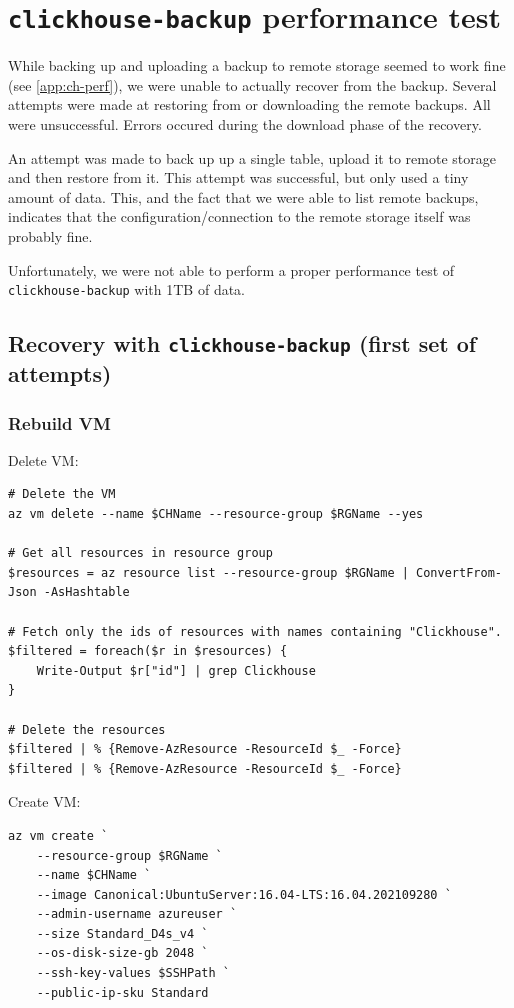 \section{\texttt{clickhouse-backup} performance test}
\label{app:chbk-perf}
While backing up and uploading a backup to remote storage
seemed to work fine (see \ref{app:ch-perf}),
we were unable to actually recover from the backup.
Several attempts were made at restoring from or downloading the remote backups.
All were unsuccessful.
Errors occured during the download phase of the recovery.

An attempt was made to back up up a single table,
upload it to remote storage and then restore from it.
This attempt was successful, but only used a tiny amount of data.
This, and the fact that we were able to list remote backups,
indicates that the configuration/connection to the remote storage itself was probably fine.

Unfortunately, we were not able to perform a proper
performance test of \texttt{clickhouse-backup} with 1TB of data.

\subsection{Recovery with \texttt{clickhouse-backup} (first set of attempts)}
\label{sec:org4d2ee6b}
\subsubsection{Rebuild VM}
\label{sec:org0452162}
Delete VM:
\begin{verbatim}
# Delete the VM
az vm delete --name $CHName --resource-group $RGName --yes

# Get all resources in resource group
$resources = az resource list --resource-group $RGName | ConvertFrom-Json -AsHashtable

# Fetch only the ids of resources with names containing "Clickhouse".
$filtered = foreach($r in $resources) {
    Write-Output $r["id"] | grep Clickhouse
}

# Delete the resources
$filtered | % {Remove-AzResource -ResourceId $_ -Force}
$filtered | % {Remove-AzResource -ResourceId $_ -Force}
\end{verbatim}

Create VM:
\begin{verbatim}
az vm create `
    --resource-group $RGName `
    --name $CHName `
    --image Canonical:UbuntuServer:16.04-LTS:16.04.202109280 `
    --admin-username azureuser `
    --size Standard_D4s_v4 `
    --os-disk-size-gb 2048 `
    --ssh-key-values $SSHPath `
    --public-ip-sku Standard
\end{verbatim}

